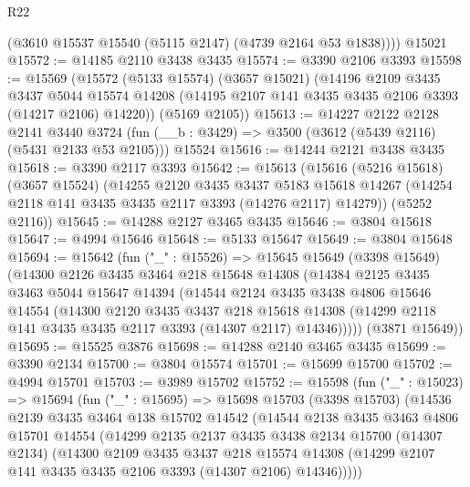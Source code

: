 \begin{lexlean}{R22}
\begin{coremodule}
        (@3610 @15537 @15540 (@5115 @2147) (@4739 @2164 @53 @1838))))
    @15021
@15572 := @14185 @2110 @3438 @3435
@15574 := @3390 @2106 @3393
@15598 := @15569
    (@15572
      (@5133 @15574)
      (@3657 @15021)
      (@14196
        @2109
        @3435
        @3437
        @5044
        @15574
        @14208
        (@14195 @2107 @141 @3435 @3435 @2106 @3393 (@14217 @2106) @14220))
      (@5169 @2105))
@15613 := @14227
    @2122
    @2128
    @2141
    @3440
    @3724
    (fun (__b : @3429) => @3500 (@3612 (@5439 @2116) (@5431 @2133 @53 @2105)))
    @15524
@15616 := @14244 @2121 @3438 @3435
@15618 := @3390 @2117 @3393
@15642 := @15613
    (@15616
      (@5216 @15618)
      (@3657 @15524)
      (@14255
        @2120
        @3435
        @3437
        @5183
        @15618
        @14267
        (@14254 @2118 @141 @3435 @3435 @2117 @3393 (@14276 @2117) @14279))
      (@5252 @2116))
@15645 := @14288 @2127 @3465 @3435
@15646 := @3804 @15618
@15647 := @4994 @15646
@15648 := @5133 @15647
@15649 := @3804 @15648
@15694 := @15642
    (fun ("_" : @15526) =>
    @15645
      @15649
      (@3398 @15649)
      (@14300
        @2126
        @3435
        @3464
        @218
        @15648
        @14308
        (@14384
          @2125
          @3435
          @3463
          @5044
          @15647
          @14394
          (@14544
            @2124
            @3435
            @3438
            @4806
            @15646
            @14554
            (@14300
              @2120
              @3435
              @3437
              @218
              @15618
              @14308
              (@14299 @2118 @141 @3435 @3435 @2117 @3393 (@14307 @2117) @14346)))))
      (@3871 @15649))
@15695 := @15525 @3876
@15698 := @14288 @2140 @3465 @3435
@15699 := @3390 @2134
@15700 := @3804 @15574
@15701 := @15699 @15700
@15702 := @4994 @15701
@15703 := @3989 @15702
@15752 := @15598
    (fun ("_" : @15023) =>
    @15694
      (fun ("_" : @15695) =>
      @15698
        @15703
        (@3398 @15703)
        (@14536
          @2139
          @3435
          @3464
          @138
          @15702
          @14542
          (@14544
            @2138
            @3435
            @3463
            @4806
            @15701
            @14554
            (@14299
              @2135
              @2137
              @3435
              @3438
              @2134
              @15700
              (@14307 @2134)
              (@14300
                @2109
                @3435
                @3437
                @218
                @15574
                @14308
                (@14299 @2107 @141 @3435 @3435 @2106 @3393 (@14307 @2106) @14346)))))

\end{coremodule}
\end{lexlean}
